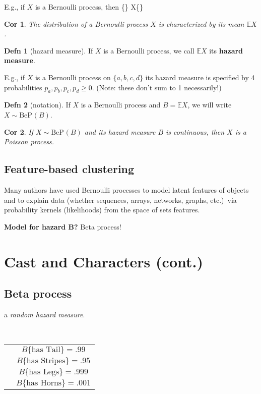 \documentclass[reqno,oneside,twocolumn,8pt]{amsart}
\newtheorem*{cor}{{\color{BrickRed}Cor}}
\theoremstyle{definition}
\newtheorem*{definition}{{\color{OliveGreen}Defn}}
\theoremstyle{remark}
\def\[#1\]{\begin{align}#1\end{align}}
\newcommand{\defn}[1]{{\bf #1}}
\newcommand{\dist}{\sim}
\newcommand{\ind}{\mathrel{\perp\mkern-9mu\perp}}
\newcommand{\thelaw}{}%
\newcommand{\BePLAW}{\mathrm{BeP_{\thelaw}}}
\newcommand{\EE}{\mathbb{E}}
\begin{document}
\noindent
E.g., if $X$ is a Bernoulli process, then
\[
X\{\} \ind X\{\}
\]

\begin{cor}
The distribution of a Bernoulli process $X$ is characterized by its mean $\EE X$.
\end{cor}

\begin{definition}[hazard measure]
If $X$ is a Bernoulli process,
we call $\EE X$ its \defn{hazard measure}.
\end{definition}

E.g., if $X$ is a Bernoulli process on $\{a,b,c,d\}$ 
its hazard measure is specified by 4 probabilities
$p_a,p_b,p_c,p_d \ge 0$.  
(Note: these don't sum to 1 necessarily!)

\begin{definition}[notation]
If $X$ is a Bernoulli process and $B = \EE X$, we
will write $X \dist \BePLAW(B)$.
\end{definition}

\begin{cor}
If $X \dist \BePLAW(B)$ 
and its hazard measure $B$ is continuous, then $X$ is a Poisson process.
\end{cor}

\subsection{Feature-based clustering} 
Many authors have used Bernoulli processes to model latent features of objects and to explain data (whether sequences, arrays, networks, graphs, etc.)~via probability kernels (likelihoods) from the space of sets features.

\noindent
{\bf Model for hazard B?} Beta process!


\newpage

\section{Cast and Characters (cont.)}

\subsection{Beta process} 

a \emph{random hazard measure}.

\ \\
\begin{tabular}{cc}
&$B\{\text{has Tail}\} = .99$ \\
&$B\{\text{has Stripes}\} = .95$ \\
&$B\{\text{has Legs}\} = .999$\\
&$B\{\text{has Horns}\} = .001$
\end{tabular}
\end{document}
